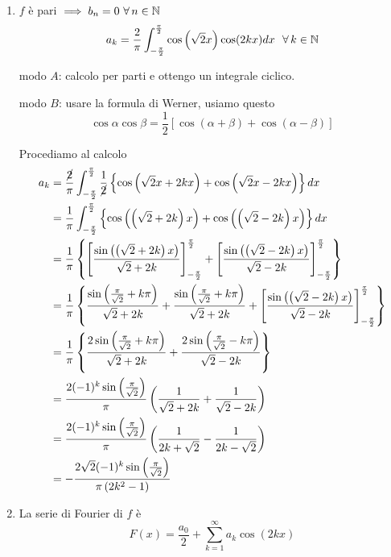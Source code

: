 \begin{enumerate}
\item $f$ è pari $\implies b_{n} = 0\ \forall n\in \NN $
\begin{equation*}
a_{k} = \frac{2}{\pi }\int ^{\frac{\pi }{2}}_{ - \frac{\pi }{2}}\cos\left(\sqrt{2} x\right)\cos(2kx) dx\ \ \forall k\in \NN 
\end{equation*}

modo $A$: calcolo per parti e ottengo un integrale ciclico.

modo $B$: usare la formula di Werner, usiamo questo
\begin{equation*}
\cos \alpha \cos \beta = \frac{1}{2}[\cos(\alpha + \beta) + \cos(\alpha - \beta)]
\end{equation*}

Procediamo al calcolo
\begin{align*}
a_{k} & = \frac{\cancel{2}}{\pi }\int ^{\frac{\pi }{2}}_{ - \frac{\pi }{2}}\frac{1}{\cancel{2}}\left\{\cos\left(\sqrt{2} x + 2kx\right) + \cos\left(\sqrt{2} x - 2kx\right)\right\} dx\\
 & = \frac{1}{\pi }\int ^{\frac{\pi }{2}}_{ - \frac{\pi }{2}}\left\{\cos\left(\left(\sqrt{2} + 2k\right) x\right) + \cos\left(\left(\sqrt{2} - 2k\right) x\right)\right\} dx\\
 & = \frac{1}{\pi }\left\{\left[\frac{\sin\left(\left(\sqrt{2} + 2k\right) x\right)}{\sqrt{2} + 2k}\right]^{\frac{\pi }{2}}_{ - \frac{\pi }{2}} + \left[\frac{\sin\left(\left(\sqrt{2} - 2k\right) x\right)}{\sqrt{2} - 2k}\right]^{\frac{\pi }{2}}_{ - \frac{\pi }{2}}\right\}\\
 & = \frac{1}{\pi }\left\{\frac{\sin\left(\frac{\pi }{\sqrt{2}} + k\pi \right)}{\sqrt{2} + 2k} + \frac{\sin\left(\frac{\pi }{\sqrt{2}} + k\pi \right)}{\sqrt{2} + 2k} + \left[\frac{\sin\left(\left(\sqrt{2} - 2k\right) x\right)}{\sqrt{2} - 2k}\right]^{\frac{\pi }{2}}_{ - \frac{\pi }{2}}\right\}\\
 & = \frac{1}{\pi }\left\{\frac{2\sin\left(\frac{\pi }{\sqrt{2}} + k\pi \right)}{\sqrt{2} + 2k} + \frac{2\sin\left(\frac{\pi }{\sqrt{2}} - k\pi \right)}{\sqrt{2} - 2k}\right\}\\
 & = \frac{2(- 1)^{k}\sin\left(\frac{\pi }{\sqrt{2}}\right)}{\pi }\left(\frac{1}{\sqrt{2} + 2k} + \frac{1}{\sqrt{2} - 2k}\right)\\
 & = \frac{2(- 1)^{k}\sin\left(\frac{\pi }{\sqrt{2}}\right)}{\pi }\left(\frac{1}{2k + \sqrt{2}} - \frac{1}{2k - \sqrt{2}}\right)\\
 & = - \frac{2\sqrt{2}(- 1)^{k}\sin\left(\frac{\pi }{\sqrt{2}}\right)}{\pi \left(2k^{2} - 1\right)}
\end{align*}
\item La serie di Fourier di $f$ è
\begin{equation*}
F(x) = \frac{a_{0}}{2} + \sum\limits ^{\infty }_{k = 1} a_{k}\cos(2kx)
\end{equation*}


\end{enumerate}
